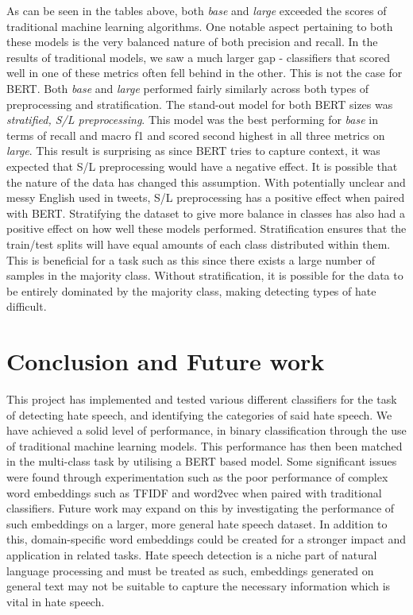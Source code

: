 \documentclass[conference]{IEEEtran}
\begin{document}
As can be seen in the tables above, both \textit{base} and \textit{large} exceeded the scores of traditional machine learning algorithms. One notable aspect pertaining to both these models is the very balanced nature of both precision and recall. In the results of traditional models, we saw a much larger gap - classifiers that scored well in one of these metrics often fell behind in the other. This is not the case for BERT. Both \textit{base} and \textit{large} performed fairly similarly across both types of preprocessing and stratification. The stand-out model for both BERT sizes was \textit{stratified, S/L preprocessing}.  This model was the best performing for \textit{base} in terms of recall and macro f1 and scored second highest in all three metrics on \textit{large}. This result is surprising as since BERT tries to capture context, it was expected that S/L preprocessing would have a negative effect. It is possible that the nature of the data has changed this assumption. With potentially unclear and messy English used in tweets, S/L preprocessing has a positive effect when paired with BERT. Stratifying the dataset to give more balance in classes has also had a positive effect on how well these models performed. Stratification ensures that the train/test splits will have equal amounts of each class distributed within them. This is beneficial for a task such as this since there exists a large number of samples in the majority class. Without stratification, it is possible for the data to be entirely dominated by the majority class, making detecting types of hate difficult. \\


\section{Conclusion and Future work}
This project has implemented and tested various different classifiers for the task of detecting hate speech, and identifying the categories of said hate speech. We have achieved a solid level of performance, in binary classification through the use of traditional machine learning models. This performance has then been matched in the multi-class task by utilising a BERT based model. Some significant issues were found through experimentation such as the poor performance of complex word embeddings such as TFIDF and word2vec when paired with traditional classifiers. Future work may expand on this by investigating the performance of such embeddings on a larger, more general hate speech dataset. In addition to this, domain-specific word embeddings could be created for a stronger impact and application in related tasks. Hate speech detection is a niche part of natural language processing and must be treated as such, embeddings generated on general text may not be suitable to capture the necessary information which is vital in hate speech.
\end{document}

